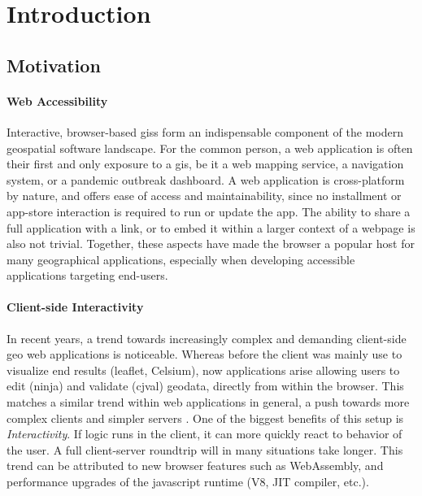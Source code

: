 \chapter{Introduction}

\section{Motivation}


\subsubsection*{ Web Accessibility }
Interactive, browser-based \ac{giss} form an indispensable component of the modern geospatial software landscape. 
For the common person, a web application is often their first and only exposure to a \acs{gis}, be it a web mapping service, a navigation system, or a pandemic outbreak dashboard. 
A web application is cross-platform by nature, and offers ease of access and  maintainability, since no installment or app-store interaction is required to run or update the app. 
The ability to share a full application with a link, or to embed it within a larger context of a webpage is also not trivial. 
Together, these aspects have made the browser a popular host for many geographical applications, especially when developing accessible applications targeting end-users. 

\subsubsection*{Client-side Interactivity}
In recent years, a trend towards increasingly complex and demanding client-side geo web applications is noticeable.  
Whereas before the client was mainly use to visualize end results (leaflet, Celsium), now applications arise allowing users to edit (ninja) and validate (cjval) geodata, directly from within the browser. 
This matches a similar trend within web applications in general, a push towards more complex clients and simpler servers \cite{panidi_hybrid_2015}.
One of the biggest benefits of this setup is \emph{Interactivity}. If logic runs in the client, it can more quickly react to behavior of the user. A full client-server roundtrip will in many situations take longer.
This trend can be attributed to new browser features such as WebAssembly, and performance upgrades of the javascript runtime (V8, JIT compiler, etc.).

